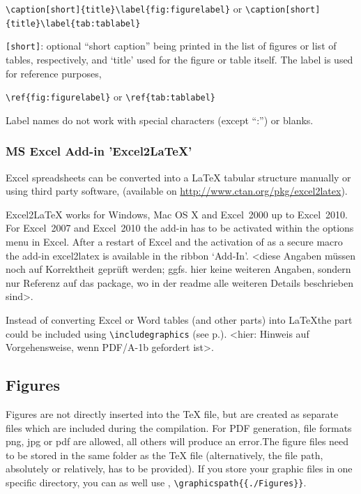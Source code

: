 \verb|\caption[short]{title}\label{fig:figurelabel}| or \newline
\verb|\caption[short]{title}\label{tab:tablabel}|

\verb|[short]|: optional \enquote{short caption} being printed in the list of figures or list of tables, respectively,
and `title' used for the figure or table itself. The label is used for reference purposes, \eg

\verb|\ref{fig:figurelabel}| or \verb|\ref{tab:tablabel}|

Label names do not work with special characters (except \enquote{:}) or blanks.

\subsubsection{MS Excel Add-in 'Excel2LaTeX'}
Excel spreadsheets can be converted into a \LaTeX{} tabular structure manually or using third party
software, \eg {} (available on \url{http://www.ctan.org/pkg/excel2latex}).

Excel2LaTeX works for Windows, Mac OS X and Excel~2000 up to Excel~2010. For Excel~2007 and
Excel~2010 the add-in has to be activated within the options menu in Excel. After a restart of Excel and
the
activation of  as a secure macro the add-in excel2latex is available in the ribbon `Add-In'.
<diese Angaben müssen noch auf Korrektheit geprüft werden; ggfs. hier keine weiteren Angaben,
sondern nur Referenz auf das package, wo in der readme alle weiteren Details beschrieben sind>.

Instead of converting Excel or Word tables (and other parts) into \LaTeX the part could be included using
\verb|\includegraphics| (see p.\pageref{sec:includepdfs}). <hier: Hinweis auf Vorgehensweise, wenn
PDF/A-1b gefordert ist>.

\newpage
\subsection{Figures}
Figures are not directly inserted into the \TeX{} file, but are created as separate files which are included
during the compilation. For PDF generation, file formats png, jpg or pdf are allowed, all others will
produce an error.The figure files need to be stored in the same folder as the \TeX{} file (alternatively, the
file path, absolutely or relatively, has to be provided). If you store your graphic files in one specific directory,
you can as well use , \eg \verb|\graphicspath{{./Figures}}|.

